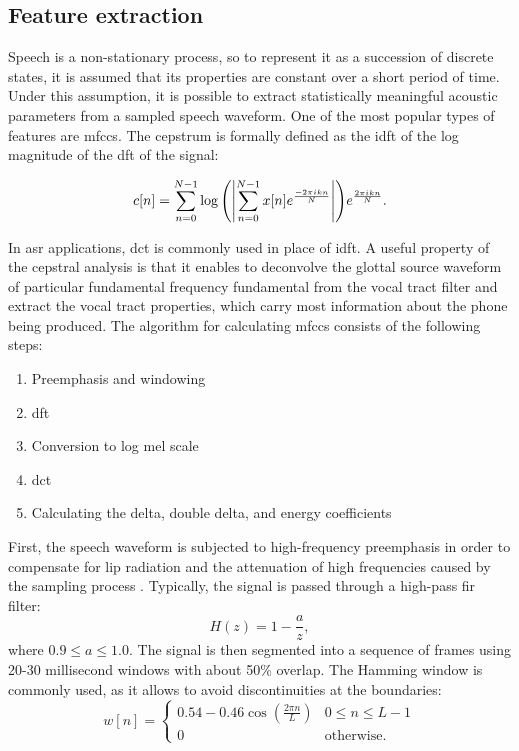 \subsection{Feature extraction}
\label{subsection:features}
Speech is a non-stationary process, so to represent it as a succession of discrete states, it is assumed that its properties are constant over a short period of time. Under this assumption, it is possible to extract statistically meaningful acoustic parameters from a sampled speech waveform. One of the most popular types of features are \glspl{mfcc}. The cepstrum is formally defined as the \gls{idft} of the log magnitude of the \gls{dft} of the signal: 

\begin{equation}
	\label{equation:cepstrum}
	c[n]=\sum_{n=0}^{N-1}\log{\left(\left|\sum_{n=0}^{N-1}x[n]e^{\frac{-2\pi ikn}{N}}\right|\right)}e^{\frac{2\pi ikn}{N}}.
\end{equation}

In \gls{asr} applications, \gls{dct} is commonly used in place of \gls{idft}. A useful property of the cepstral analysis is that it enables to deconvolve the glottal source waveform of particular fundamental frequency \gls{fundamental} from the vocal tract filter and extract the vocal tract properties, which carry most information about the phone being produced. The algorithm for calculating \glspl{mfcc} consists of the following steps:
\begin{enumerate}
	\item Preemphasis and windowing
	\item \gls{dft}
	\item Conversion to log mel scale 
	\item \gls{dct}
	\item Calculating the delta, double delta, and energy coefficients
\end{enumerate}

First, the speech waveform is subjected to high-frequency preemphasis in order to compensate for lip radiation and the attenuation of high frequencies caused by the sampling process \cite{singh2012preprocessing}. Typically, the signal is passed through a high-pass \gls{fir} filter:
\begin{equation}
H(z)=1-\frac{a}{z},
\end{equation}
where $0.9 \leq a \leq 1.0$. The signal is then segmented into a sequence of frames using 20-30 millisecond windows with about 50\% overlap. The Hamming window is commonly used, as it allows to avoid discontinuities at the boundaries:
\begin{equation}
\label{equation:hamming}
  w[n]=
  \begin{cases}
    0.54-0.46\cos(\frac{2 \pi n}{L}) & 0 \leq n \leq L-1 \\
    0                               & \text{otherwise.}
  \end{cases}
\end{equation}


